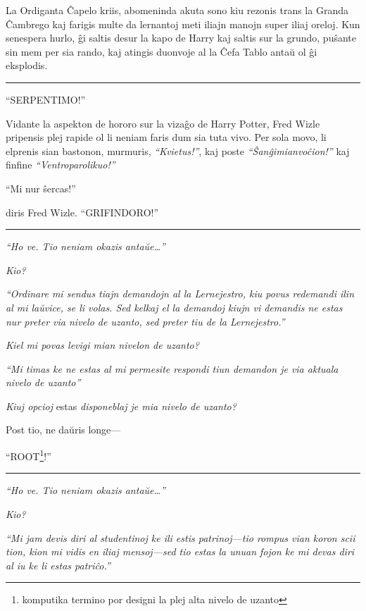 La Ordiganta Ĉapelo kriis, abomeninda akuta sono kiu rezonis trans la
Granda Ĉambrego kaj farigis multe da lernantoj meti iliajn manojn
super iliaj oreloj. Kun senespera hurlo, ĝi saltis desur la kapo de
Harry kaj saltis sur la grundo, puŝante sin mem per sia rando, kaj
atingis duonvoje al la Ĉefa Tablo antaŭ ol ĝi eksplodis.

\begin{center}\rule{3in}{0.4pt}\end{center}

``SERPENTIMO!''

Vidante la aspekton de hororo sur la vizaĝo de Harry Potter, Fred
Wizle pripensis plej rapide ol li neniam faris dum sia tuta vivo. Per
sola movo, li elprenis sian bastonon, murmuris, \emph{``Kvietus!''},
kaj poste \emph{``Ŝanĝimianvoĉion!''} kaj finfine
\emph{``Ventroparolikuo!''}

``Mi nur ŝercas!''

diris Fred Wizle. ``GRIFINDORO!''

\begin{center}\rule{3in}{0.4pt}\end{center}

\emph{``Ho ve. Tio neniam okazis antaŭe\ldots''}

\emph{Kio?}

\emph{``Ordinare mi sendus tiajn demandojn al la Lernejestro, kiu
  povus redemandi ilin al mi laŭvice, se li volas. Sed kelkaj el la
  demandoj kiujn vi demandis ne estas nur preter via nivelo de uzanto,
  sed preter tiu de la Lernejestro.''}

\emph{Kiel mi povas levigi mian nivelon de uzanto?}

\emph{``Mi timas ke ne estas al mi permesite respondi tiun demandon je
  via aktuala nivelo de uzanto''}

\emph{Kiuj opcioj} estas \emph{disponeblaj je mia nivelo de uzanto?}

Post tio, ne daŭris longe—

``ROOT\footnote{komputika termino por designi la plej alta nivelo de
  uzanto}!''

\begin{center}\rule{3in}{0.4pt}\end{center}

\emph{``Ho ve. Tio neniam okazis antaŭe\ldots''}

\emph{Kio?}

\emph{``Mi jam devis diri al studentinoj ke ili estis patrinoj—tio
  rompus vian koron scii tion, kion mi vidis en iliaj mensoj—sed tio
  estas la unuan fojon ke mi devas diri al iu ke li estas patriĉo.''}

